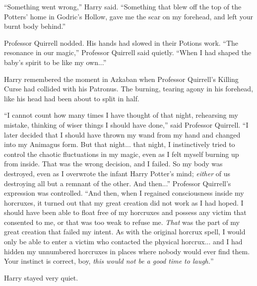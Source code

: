 ``Something went wrong,'' Harry said. ``Something that blew off the top of the Potters' home in Godric's Hollow, gave me the scar on my forehead, and left your burnt body behind.''

Professor Quirrell nodded. His hands had slowed in their Potions work. ``The resonance in our magic,'' Professor Quirrell said quietly. ``When I had shaped the baby's spirit to be like my own...''

Harry remembered the moment in Azkaban when Professor Quirrell's Killing Curse had collided with his Patronus. The burning, tearing agony in his forehead, like his head had been about to split in half.

``I cannot count how many times I have thought of that night, rehearsing my mistake, thinking of wiser things I should have done,'' said Professor Quirrell. ``I later decided that I should have thrown my wand from my hand and changed into my Animagus form. But that night... that night, I instinctively tried to control the chaotic fluctuations in my magic, even as I felt myself burning up from inside. That was the wrong decision, and I failed. So my body was destroyed, even as I overwrote the infant Harry Potter's mind; \emph{either} of us destroying all but a remnant of the other. And then...'' Professor Quirrell's expression was controlled. ``And then, when I regained consciousness inside my horcruxes, it turned out that my great creation did not work as I had hoped. I should have been able to float free of my horcruxes and possess any victim that consented to me, or that was too weak to refuse me. \emph{That} was the part of my great creation that failed my intent. As with the original horcrux spell, I would only be able to enter a victim who contacted the physical horcrux... and I had hidden my unnumbered horcruxes in places where nobody would ever find them. Your instinct is correct, boy, \emph{this would not be a good time to laugh.}''

Harry stayed very quiet.

